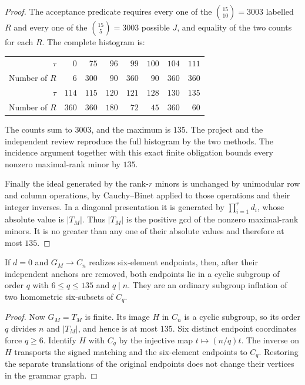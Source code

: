 \begin{proof}
The acceptance predicate requires every one of the $\binom{15}{10}=3003$
labelled $R$ and every one of the $\binom{15}{5}=3003$ possible $J$,
and equality of the two counts for each $R$. The complete histogram is:
\begin{center}\small
\begin{tabular}{r|rrrrrrr}
\toprule
$\tau$ & $0$ & $75$ & $96$ & $99$ & $100$ & $104$ & $111$\\
Number of $R$ & $6$ & $300$ & $90$ & $360$ & $90$ & $360$ & $360$\\
\midrule
$\tau$ & $114$ & $115$ & $120$ & $121$ & $128$ & $130$ & $135$\\
Number of $R$ & $360$ & $360$ & $180$ & $72$ & $45$ & $360$ & $60$\\
\bottomrule
\end{tabular}
\end{center}
The counts sum to $3003$, and the maximum is $135$. The project and
the independent review reproduce the full histogram by the two methods.
The incidence argument together with this exact finite obligation bounds
every nonzero maximal-rank minor by $135$.

Finally the ideal generated by the rank-$r$ minors is unchanged by
unimodular row and column operations, by Cauchy--Binet applied to those
operations and their integer inverses. In a diagonal presentation it
is generated by $\prod_{i=1}^r d_i$, whose absolute value is $|T_M|$.
Thus $|T_M|$ is the positive gcd of the nonzero maximal-rank minors.
It is no greater than any one of their absolute values and therefore
at most $135$.
\end{proof}

\begin{corollary}\label{cor:finite}
If $d=0$ and $G_M\to C_n$ realizes six-element endpoints, then, after
their independent anchors are removed, both endpoints lie in a cyclic
subgroup of order $q$ with $6\le q\le135$ and $q\mid n$. They are an
ordinary subgroup inflation of two homometric six-subsets of $C_q$.
\end{corollary}
\begin{proof}
Now $G_M=T_M$ is finite. Its image $H$ in $C_n$ is a cyclic subgroup,
so its order $q$ divides $n$ and $|T_M|$, and hence is at most $135$.
Six distinct endpoint coordinates force $q\ge6$. Identify $H$ with
$C_q$ by the injective map $t\mapsto(n/q)t$. The inverse on $H$
transports the signed matching and the six-element endpoints to $C_q$.
Restoring the separate translations of the original endpoints does not
change their vertices in the grammar graph.
\end{proof}

